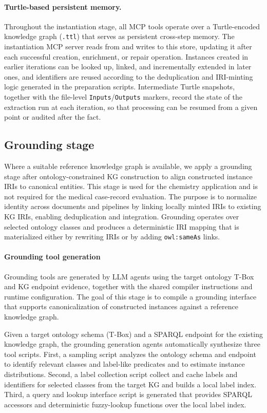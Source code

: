 \paragraph{Turtle-based persistent memory.}
Throughout the instantiation stage, all MCP tools operate over a
Turtle-encoded knowledge graph (\texttt{.ttl}) that serves as persistent
cross-step memory. The instantiation MCP server reads from and writes to
this store, updating it after each successful creation, enrichment, or repair
operation. Instances created in earlier iterations can be looked up, linked,
and incrementally extended in later ones, and identifiers are reused according
to the deduplication and IRI-minting logic generated in the preparation
scripts. Intermediate Turtle snapshots, together with the file-level
\texttt{Inputs}/\texttt{Outputs} markers, record the state of the extraction
run at each iteration, so that processing can be resumed from a given point or
audited after the fact.
  

\subsection{Grounding stage}

Where a suitable reference knowledge graph is available, we apply a grounding stage after ontology-constrained KG construction to align constructed instance IRIs to canonical entities. This stage is used for the chemistry application and is not required for the medical case-record evaluation.
The purpose is to normalize identity across documents and pipelines by linking locally minted IRIs to existing KG IRIs, enabling deduplication and integration.
Grounding operates over selected ontology classes and produces a deterministic IRI mapping that is materialized either by rewriting IRIs or by adding \texttt{owl:sameAs} links.


\paragraph{Grounding tool generation}

Grounding tools are generated by LLM agents using the target ontology T-Box and KG endpoint evidence, together with the shared compiler instructions and runtime configuration.
The goal of this stage is to compile a grounding interface that supports canonicalization of constructed instances against a reference knowledge graph.

Given a target ontology schema (T-Box) and a SPARQL endpoint for the existing knowledge graph, the grounding generation agents automatically synthesize three tool scripts.
First, a sampling script analyzes the ontology schema and endpoint to identify relevant classes and label-like predicates and to estimate instance distributions.
Second, a label collection script collect and cache labels and identifiers for selected classes from the target KG and builds a local label index.
Third, a query and lookup interface script is generated that provides SPARQL accessors and deterministic fuzzy-lookup functions over the local label index.

